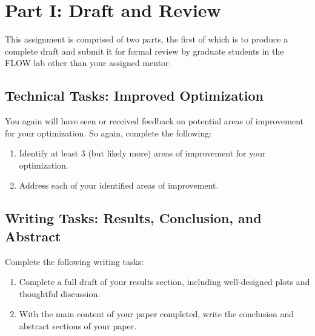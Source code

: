 \documentclass[12pt]{article}
\begin{document}
	
\section{Part I: Draft and Review}

This assignment is comprised of two parts, the first of which is to produce a complete draft and submit it for formal review by graduate students in the FLOW lab other than your assigned mentor.
	
	

\subsection{Technical Tasks: Improved Optimization}

You again will have seen or received feedback on potential areas of improvement for your optimization.
So again, complete the following:

\begin{enumerate}[label=\alph*.]
	\item Identify at least 3 (but likely more) areas of improvement for your optimization.
	\item Address each of your identified areas of improvement.
\end{enumerate}



	

\subsection{Writing Tasks: Results, Conclusion, and Abstract}

Complete the following writing tasks:

\begin{enumerate}[label=\alph*.]
	\item Complete a full draft of your results section, including well-designed plots and thoughtful discussion.  
	\item With the main content of your paper completed, write the conclusion and abstract sections of your paper.
\end{enumerate}

\end{document}
